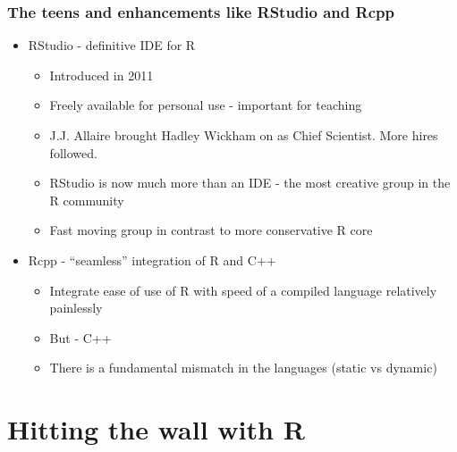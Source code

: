 \documentclass[pdf]{beamer}
\begin{document}
  \begin{frame}\frametitle{The teens and enhancements like RStudio and Rcpp}
  \begin{itemize}
    \pause
    \item RStudio - definitive IDE for R
    \pause
    \begin{itemize}
      \item Introduced in 2011
      \item Freely available for personal use - important for teaching
      \item J.J. Allaire brought Hadley Wickham on as Chief Scientist.  More hires followed.
      \item RStudio is now much more than an IDE - the most creative group in the R community
      \item Fast moving group in contrast to more conservative R core
    \end{itemize}
    \item Rcpp - ``seamless'' integration of R and C++
    \pause
    \begin{itemize}
      \item Integrate ease of use of R with speed of a compiled language relatively painlessly
      \item But - C++
      \item There is a fundamental mismatch in the languages (static vs dynamic)
    \end{itemize}
  \end{itemize}

  \end{frame}

\section{Hitting the wall with R}
\end{document}
